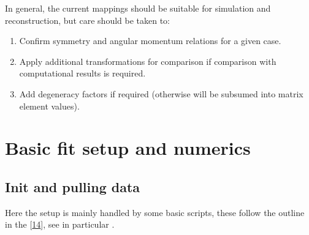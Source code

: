\documentclass[letterpaper,table,10pt,english]{jupyterBook}
\begin{document}
\sphinxAtStartPar
In general, the current mappings should be suitable for simulation and reconstruction, but care should be taken to:
\begin{enumerate}
%
\item {} 
\sphinxAtStartPar
Confirm symmetry and angular momentum relations for a given case.

\item {} 
\sphinxAtStartPar
Apply additional transformations for comparison if comparison with computational results is required.

\item {} 
\sphinxAtStartPar
Add degeneracy factors if required (otherwise will be subsumed into matrix element values).

\end{enumerate}

\sphinxstepscope


\chapter{Basic fit setup and numerics}
\label{\detokenize{part2/basic_fitting_numerics_intro_260423:basic-fit-setup-and-numerics}}\label{\detokenize{part2/basic_fitting_numerics_intro_260423:sect-basic-fit-setup}}\label{\detokenize{part2/basic_fitting_numerics_intro_260423::doc}}

\section{Init and pulling data}
\label{\detokenize{part2/basic_fitting_numerics_intro_260423:init-and-pulling-data}}
\sphinxAtStartPar
Here the setup is mainly handled by some basic scripts, these follow the outline in the  {[}\hyperlink{cite.backmatter/bibliography:id667}{14}{]}, see in particular .
\end{document}
